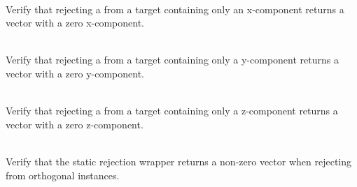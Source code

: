 \begin{DoxyRefList}
\item[{\parbox[t]{\linewidth}{Member \doxylink{_projection_tests_8cpp_abd126b5749239148b029535705907c9b}{Vector4\+DRejection\+\_\+\+Rejection\+From\+XAxis\+Returns\+Vector\+With\+Zero\+XComponent} ()}}]\hfill \\
\label{test__test000136}%
%
Verify that rejecting a  from a target  containing only an x-\/component returns a vector with a zero x-\/component.  
\item[{\parbox[t]{\linewidth}{Member \doxylink{_projection_tests_8cpp_aa4c9eb1430d0d35b655af4a75677823b}{Vector4\+DRejection\+\_\+\+Rejection\+From\+YAxis\+Returns\+Vector\+With\+Zero\+YComponent} ()}}]\hfill \\
\label{test__test000137}%
%
Verify that rejecting a  from a target  containing only a y-\/component returns a vector with a zero y-\/component.  
\item[{\parbox[t]{\linewidth}{Member \doxylink{_projection_tests_8cpp_ac9be3653ba0d5052e5d4435d7b9e8918}{Vector4\+DRejection\+\_\+\+Rejection\+From\+ZAxis\+Returns\+Vector\+With\+Zero\+ZComponent} ()}}]\hfill \\
\label{test__test000138}%
%
Verify that rejecting a  from a target  containing only a z-\/component returns a vector with a zero z-\/component.  
\item[{\parbox[t]{\linewidth}{Member \doxylink{_projection_tests_8cpp_a7c89987efde21c814a27545d323ad83b}{Vector4\+DRejection\+\_\+\+Static\+Wrapper\+\_\+\+Non\+Orthogonal\+Rejection\+Returns\+Non\+Zero\+Vector} ()}}]\hfill \\
\label{test__test000142}%
%
Verify that the  static rejection wrapper returns a non-\/zero vector when rejecting from orthogonal instances.  
\item[{\parbox[t]{\linewidth}{Member \doxylink{group___f_g_m___vec4___division_gac0e1796c59ffa38ab278a0568abbf1af}{Vector4\+DScalar\+Division\+\_\+\+Division\+By\+One\+Returns\+Original\+Vector} ()}}]\hfill \\
\label{test__test000034}%
%

\end{DoxyRefList}
